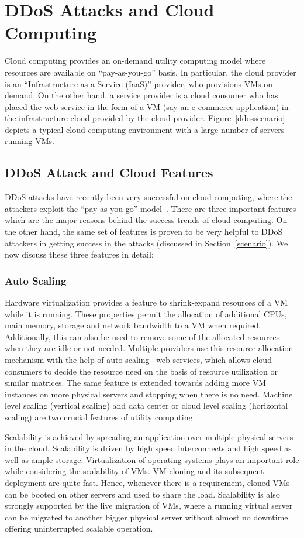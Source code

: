 \documentclass[final,5p,times,twocolumn]{elsarticle}
\begin{document}
\section{DDoS Attacks and Cloud Computing}
\label{Cloudcomputing}
Cloud computing provides an on-demand utility computing model where resources are available on ``pay-as-you-go'' basis. { In particular, the cloud provider is an ``Infrastructure as a Service (IaaS)'' provider, who provisions VMs on-demand. On the other hand, a service provider is a cloud consumer who has placed the web service in the form of a VM (say an e-commerce application) in the infrastructure cloud provided by the cloud provider.} Figure~\ref{ddosscenario} depicts a typical cloud computing environment with a large number of servers running VMs. 

\subsection{DDoS Attack and Cloud Features}
DDoS attacks have recently been very successful on cloud computing, where the attackers exploit the ``pay-as-you-go'' model~\cite{cloudddosnews}. There are three important features which are the major reasons behind the success trends of cloud computing. On the other hand, the same set of features is proven to be very helpful to DDoS attackers in getting success in the attacks (discussed in Section~\ref{scenario}). We now discuss these three features in detail:
\subsubsection{Auto Scaling} Hardware virtualization provides a feature to shrink-expand resources of a VM while it is running. These properties permit the allocation of additional CPUs, main memory, storage and network bandwidth to a VM when required. Additionally, this can also be used to remove some of the allocated resources when they are idle or not needed. Multiple providers use this resource allocation mechanism with the help of auto scaling~\cite{RAA} web services, which allows cloud consumers to decide the resource need on the basis of resource utilization or similar matrices. The same feature is extended towards adding more VM instances on more physical servers and stopping when there is no need. Machine level scaling (vertical scaling) and data center or cloud level scaling (horizontal scaling) are two crucial features of utility computing. \par Scalability is achieved by spreading an application over multiple physical servers in the cloud. Scalability is driven by high speed interconnects and high speed as well as ample storage. Virtualization of operating systems plays an important role while considering the scalability of VMs. VM cloning and its subsequent deployment are quite fast. Hence, whenever there is a requirement, cloned VMs can be booted on other servers and used to share the load. Scalability is also strongly supported by the live migration of VMs, where a running virtual server can be migrated to another bigger physical server without almost no downtime offering uninterrupted scalable operation.
\end{document}
